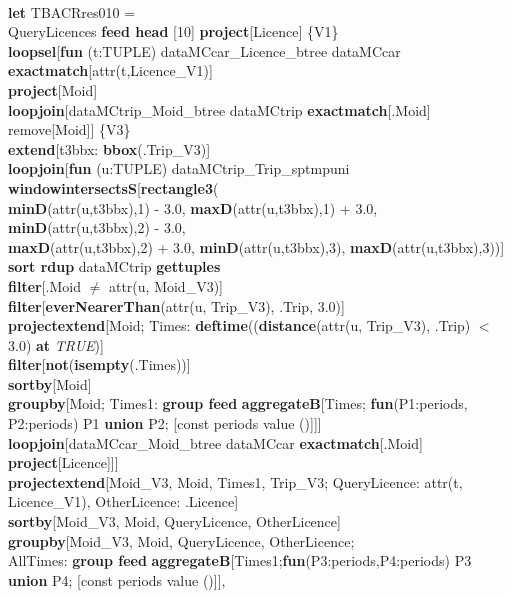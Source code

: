\documentclass[a4paper]{article}
\newcommand{\op}[1]{\textbf{#1}}
\newcommand{\true}{\textsl{TRUE}}
\begin{document}
\begin{scriptsize}
\begin{tabbing}
\\
\op{let} TBACRres010 =\\
\>QueryLicences \op{feed head} [10] \op{project}[Licence] \{V1\}\\
\>\op{loopsel}[\op{fun} (t:TUPLE) dataMCcar\_Licence\_btree dataMCcar \op{exactmatch}[attr(t,Licence\_V1)]\\
\>\>\op{project}[Moid]\\
\>\>\op{loopjoin}[dataMCtrip\_Moid\_btree dataMCtrip \op{exactmatch}[.Moid] remove[Moid]] \{V3\}\\
\>\>\op{extend}[t3bbx: \op{bbox}(.Trip\_V3)]\\
\>\>\op{loopjoin}[\op{fun} (u:TUPLE) dataMCtrip\_Trip\_sptmpuni \op{windowintersectsS}[\op{rectangle3}(\\
\>\>\>\>\op{minD}(attr(u,t3bbx),1) - 3.0, \op{maxD}(attr(u,t3bbx),1) + 3.0, \op{minD}(attr(u,t3bbx),2) - 3.0,\\
\>\>\>\>\op{maxD}(attr(u,t3bbx),2) + 3.0, \op{minD}(attr(u,t3bbx),3), \op{maxD}(attr(u,t3bbx),3))]\\
\>\>\>\op{sort rdup} dataMCtrip \op{gettuples}\\
\>\>\>\op{filter}[.Moid $\neq$ attr(u, Moid\_V3)]\\
\>\>\>\op{filter}[\op{everNearerThan}(attr(u, Trip\_V3), .Trip, 3.0)]\\
\>\>\>\op{projectextend}[Moid; Times: \op{deftime}((\op{distance}(attr(u, Trip\_V3), .Trip) $<$ 3.0) \op{at} \true{})]\\
\>\>\>\op{filter}[\op{not}(\op{isempty}(.Times))]\\
\>\>\>\op{sortby}[Moid]\\
\>\>\>\op{groupby}[Moid; Times1: \op{group feed}
\>\>\>\>\>\op{aggregateB}[Times; \op{fun}(P1:periods, P2:periods) P1 \op{union} P2; [const periods value ()]]]\\
\>\>\>\op{loopjoin}[dataMCcar\_Moid\_btree dataMCcar \op{exactmatch}[.Moid]\\
\>\>\>\>\op{project}[Licence]]]\\
\>\>\op{projectextend}[Moid\_V3, Moid, Times1, Trip\_V3; QueryLicence: attr(t, Licence\_V1), OtherLicence: .Licence]\\
\>\>\op{sortby}[Moid\_V3, Moid, QueryLicence, OtherLicence]\\
\>\>\op{groupby}[Moid\_V3, Moid, QueryLicence, OtherLicence;\\
\>\>\>\>AllTimes: \op{group feed} \op{aggregateB}[Times1;\op{fun}(P3:periods,P4:periods) P3 \op{union} P4; [const periods value ()]],\\

\end{tabbing}
\end{scriptsize}
\end{document}
